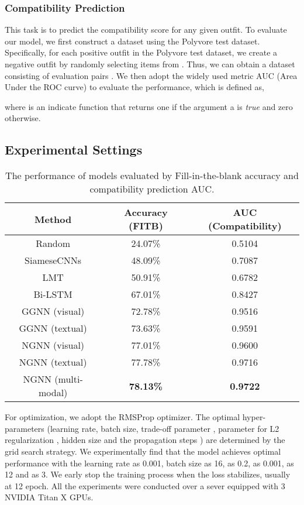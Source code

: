 \documentclass[sigconf]{acmart}
\begin{document}
\subsubsection{Compatibility Prediction}
This task is to predict the compatibility score for any given outfit.
To evaluate our model, we first construct a dataset  using the Polyvore test dataset.
Specifically, for each positive outfit  in the Polyvore test dataset, we create a negative outfit  by randomly selecting  items from . Thus, we can obtain a dataset  consisting of evaluation pairs . We then adopt the widely used metric AUC (Area Under the ROC curve) to evaluate the performance, which is defined as,

where  is an indicate function
that returns one if the argument a is \emph{true} and zero otherwise.

\subsection{Experimental Settings}





\begin{table}[htbp]
  \centering
  \caption{The performance of models evaluated by Fill-in-the-blank accuracy and compatibility prediction AUC.}
    \begin{tabular}{ccc}
    \toprule
    Method & Accuracy (FITB)   &  AUC (Compatibility) \\
    \midrule
    Random &  24.07\%& 0.5104  \\
SiameseCNNs & 48.09\%   & 0.7087 \\
    LMT   &  50.91\%  & 0.6782\\
    Bi-LSTM & 67.01\%  & 0.8427  \\
GGNN (visual)& 72.78\%  &  0.9516 \\
    GGNN (textual)& 73.63\%  &  0.9591 \\
    \midrule
    NGNN (visual) & 77.01\%  & 0.9600 \\
    NGNN (textual) & 77.78\%  &  0.9716 \\
    NGNN (multi-modal)& \textbf{78.13\%}  & \textbf{0.9722} \\
    \bottomrule
    \end{tabular}\label{tab:compared_method}\end{table}

For optimization, we adopt the RMSProp optimizer. The optimal hyper-parameters (learning rate, batch size, trade-off parameter , parameter for L2 regularization , hidden size  and the propagation steps ) are determined by the grid search strategy. We experimentally find that the model achieves optimal performance with the learning rate as 0.001, batch size as 16,  as 0.2,  as 0.001,  as 12 and  as 3.
We early stop the training process when the loss stabilizes, usually at 12 epoch. All the experiments were conducted over a sever equipped with 3 NVIDIA Titan X GPUs.
\end{document}
